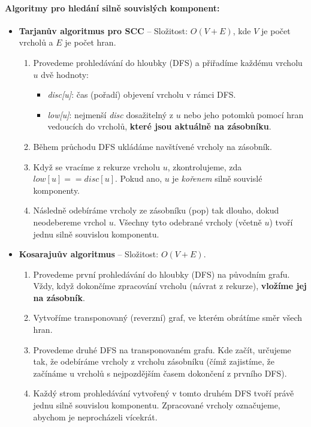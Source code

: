 \paragraph*{Algoritmy pro hledání silně souvislých komponent:}
\begin{itemize}
\item \textbf{Tarjanův algoritmus pro SCC} -- Složitost: $O(V + E)$, kde $V$ je počet vrcholů a $E$ je počet hran.
\begin{enumerate}
    \item Provedeme prohledávání do hloubky (DFS) a přiřadíme každému vrcholu $u$ dvě hodnoty: 
    \begin{itemize}
        \item \textit{disc[u]}: čas (pořadí) objevení vrcholu v rámci DFS.
        \item \textit{low[u]}: nejmenší \textit{disc} dosažitelný z $u$ nebo jeho potomků pomocí hran vedoucích do vrcholů, \textbf{které jsou aktuálně na zásobníku}.
    \end{itemize}
    \item Během průchodu DFS ukládáme navštívené vrcholy na zásobník. 
    \item Když se vracíme z rekurze vrcholu $u$, zkontrolujeme, zda $low[u] == disc[u]$. Pokud ano, $u$ je \textit{kořenem} silně souvislé komponenty.
    \item Následně odebíráme vrcholy ze zásobníku (pop) tak dlouho, dokud neodebereme vrchol $u$. Všechny tyto odebrané vrcholy (včetně $u$) tvoří jednu silně souvislou komponentu.
\end{enumerate}

\item \textbf{Kosarajuův algoritmus} -- Složitost: $O(V + E)$.
\begin{enumerate}
    \item Provedeme první prohledávání do hloubky (DFS) na původním grafu. Vždy, když dokončíme zpracování vrcholu (návrat z rekurze), \textbf{vložíme jej na zásobník}.
    \item Vytvoříme transponovaný (reverzní) graf, ve kterém obrátíme směr všech hran.
    \item Provedeme druhé DFS na transponovaném grafu. Kde začít, určujeme tak, že odebíráme vrcholy z vrcholu zásobníku (čímž zajistíme, že začínáme u vrcholů s nejpozdějším časem dokončení z prvního DFS).
    \item Každý strom prohledávání vytvořený v tomto druhém DFS tvoří právě jednu silně souvislou komponentu. Zpracované vrcholy označujeme, abychom je neprocházeli vícekrát.
\end{enumerate}
\end{itemize}

